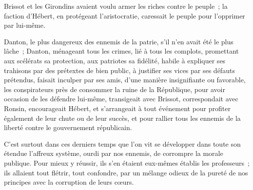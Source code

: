 \documentclass[french,twoside]{book} %
\begin{document}
Brissot et les Girondins avaient voulu armer les riches contre le peuple ; la faction d’Hébert, en protégeant l’aristocratie, caressait le peuple pour l’opprimer par lui-même.\par
Danton, le plus dangereux des ennemis de la patrie, s’il n’en avait été le plus lâche ; Danton, ménageant tous les crimes, lié à tous les complots, promettant aux scélérats sa protection, aux patriotes sa fidélité, habile à expliquer ses trahisons par des prétextes de bien public, à justifier ses vices par ses défauts prétendus, faisait inculper par ses amis, d’une manière insignifiante ou favorable, les conspirateurs près de consommer la ruine de la République, pour avoir occasion de les défendre lui-même, transigeait avec Brissot, correspondait avec Ronsin, encourageait Hébert, et s’arrangeait à tout événement pour profiter également de leur chute ou de leur succès, et pour rallier tous les ennemis de la liberté contre le gouvernement républicain.\par
C’est surtout dans ces derniers temps que l’on vit se développer dans toute son étendue l’affreux système, ourdi par nos ennemis, de corrompre la morale publique. Pour mieux y réussir, ils s’en étaient eux-mêmes établis les professeurs ; ils allaient tout flétrir, tout confondre, par un mélange odieux de la pureté de nos principes avec la corruption de leurs cœurs.\par
\end{document}
